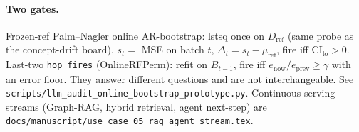 \paragraph{Two gates.}
Frozen-ref Palm--Nagler online AR-bootstrap: lstsq once on \(D_{\mathrm{ref}}\)
(same probe as the concept-drift board), \(s_t=\) MSE on batch \(t\),
\(\Delta_t=s_t-\mu_{\mathrm{ref}}\), fire iff \(\mathrm{CI}_{\mathrm{lo}}>0\).
Last-two \texttt{hop\_fires} (OnlineRFPerm): refit on \(B_{t-1}\), fire iff
\(e_{\mathrm{now}}/e_{\mathrm{prev}}\ge\gamma\) with an error floor.
They answer different questions and are not interchangeable.
See \texttt{scripts/llm\_audit\_online\_bootstrap\_prototype.py}.
Continuous serving streams (Graph-RAG, hybrid retrieval, agent next-step) are
\texttt{docs/manuscript/use\_case\_05\_rag\_agent\_stream.tex}.
